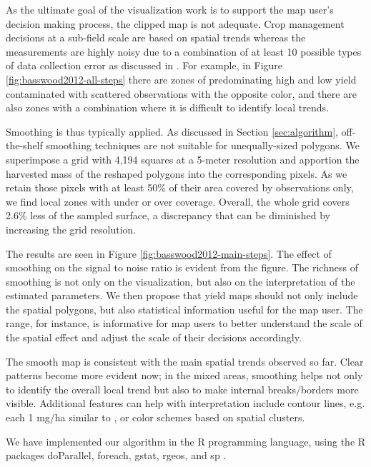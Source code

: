  As the ultimate goal of the visualization
work is to support the map user's decision making process, the clipped
map is not adequate. Crop management decisions at a sub-field scale
are based on spatial trends whereas the measurements are highly noisy
due to a combination of at least 10 possible types of data collection
error as discussed in \cite{Lyle2013}. For example, in Figure
\ref{fig:basswood2012-all-steps} there are zones of predominating high
and low yield contaminated with scattered observations with the
opposite color, and there are also zones with a combination where it
is difficult to identify local trends.

 Smoothing is thus
typically applied. As discussed in Section \ref{sec:algorithm},
off-the-shelf smoothing techniques are not suitable for
unequally-sized polygons. We superimpose a grid with 4,194 squares at
a 5-meter resolution and apportion the harvested mass of the reshaped
polygons into the corresponding pixels. As we retain those pixels with
at least 50\% of their area covered by observations only, we find
local zones with under or over coverage. Overall, the whole grid
covers 2.6\% less of the sampled surface, a discrepancy that can be
diminished by increasing the grid resolution.

 The results are seen in Figure
\ref{fig:basswood2012-main-steps}. The effect of smoothing on the
signal to noise ratio is evident from the figure. The richness of
smoothing is not only on the visualization, but also on the
interpretation of the estimated parameters. We then propose that yield
maps should not only include the spatial polygons, but also
statistical information useful for the map user. The range, for
instance, is informative for map users to better understand the scale
of the spatial effect and adjust the scale of their decisions
accordingly. %

 The smooth map is consistent with
the main spatial trends observed so far. Clear patterns become more
evident now; in the mixed areas, smoothing helps not only to identify
the overall local trend but also to make internal breaks/borders more
visible. Additional features can help with interpretation include
contour lines, e.g. each 1 mg/ha similar to \cite{Blackmore1999}, or
color schemes based on spatial clusters.

We have implemented our algorithm in the R programming language, using
the R packages doParallel, foreach, gstat, rgeos, and sp
\citep{Pebesma2004, Pebesma2005, Bivand2013, Graeler2016,
  Microsoft2017, Corporation2018, RCT2019, Bivand2019}.


